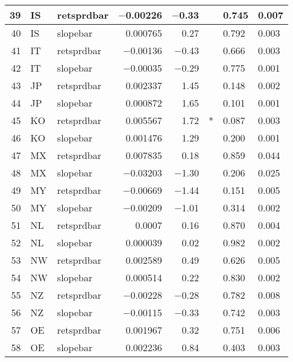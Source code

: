 \begin{longtable}{|r|l|l|r|r|l|l|l|}
   39 &    IS &    retsprdbar &    $-$0.00226 &    $-$0.33 &      &    0.745 &    0.007\\\hline
   40 &    IS &    slopebar &    0.000765 &    0.27 &      &    0.792 &    0.003\\\hline
   41 &    IT &    retsprdbar &    $-$0.00136 &    $-$0.43 &      &    0.666 &    0.003\\\hline
   42 &    IT &    slopebar &    $-$0.00035 &    $-$0.29 &      &    0.775 &    0.001\\\hline
   43 &    JP &    retsprdbar &    0.002337 &    1.45 &      &    0.148 &    0.002\\\hline
   44 &    JP &    slopebar &    0.000872 &    1.65 &      &    0.101 &    0.001\\\hline
   45 &    KO &    retsprdbar &    0.005567 &    1.72 &    * &    0.087 &    0.003\\\hline
   46 &    KO &    slopebar &    0.001476 &    1.29 &      &    0.200 &    0.001\\\hline
   47 &    MX &    retsprdbar &    0.007835 &    0.18 &      &    0.859 &    0.044\\\hline
   48 &    MX &    slopebar &    $-$0.03203 &    $-$1.30 &      &    0.206 &    0.025\\\hline
   49 &    MY &    retsprdbar &    $-$0.00669 &    $-$1.44 &      &    0.151 &    0.005\\\hline
   50 &    MY &    slopebar &    $-$0.00209 &    $-$1.01 &      &    0.314 &    0.002\\\hline
   51 &    NL &    retsprdbar &    0.0007 &    0.16 &      &    0.870 &    0.004\\\hline
   52 &    NL &    slopebar &    0.000039 &    0.02 &      &    0.982 &    0.002\\\hline
   53 &    NW &    retsprdbar &    0.002589 &    0.49 &      &    0.626 &    0.005\\\hline
   54 &    NW &    slopebar &    0.000514 &    0.22 &      &    0.830 &    0.002\\\hline
   55 &    NZ &    retsprdbar &    $-$0.00228 &    $-$0.28 &      &    0.782 &    0.008\\\hline
   56 &    NZ &    slopebar &    $-$0.00115 &    $-$0.33 &      &    0.742 &    0.003\\\hline
   57 &    OE &    retsprdbar &    0.001967 &    0.32 &      &    0.751 &    0.006\\\hline
   58 &    OE &    slopebar &    0.002236 &    0.84 &      &    0.403 &    0.003\\\hline

\end{longtable}
